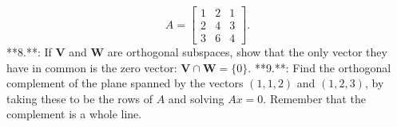 \[A=\begin{bmatrix}1&2&1\\ 2&4&3\\ 3&6&4\end{bmatrix}.\]
**8.**: If \(\mathbf{V}\) and \(\mathbf{W}\) are orthogonal subspaces, show that the only vector they have in common is the zero vector: \(\mathbf{V}\cap\mathbf{W}=\{0\}\).
**9.**: Find the orthogonal complement of the plane spanned by the vectors \((1,1,2)\) and \((1,2,3)\), by taking these to be the rows of \(A\) and solving \(Ax=0\). Remember that the complement is a whole line.

 